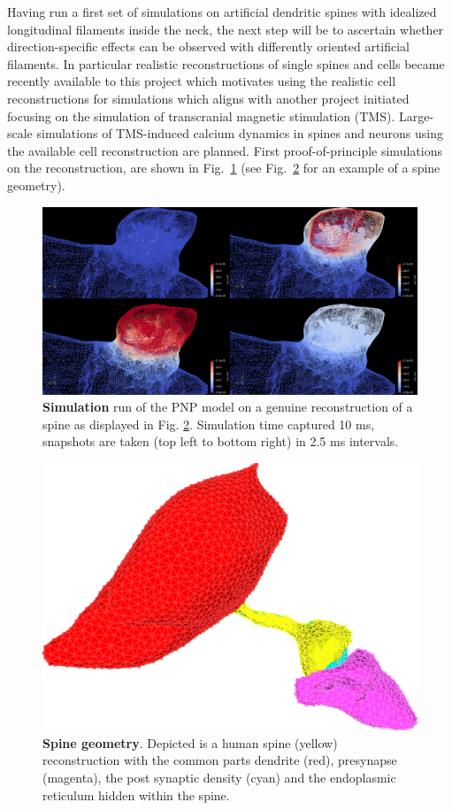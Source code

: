 Having run a first set of simulations on artificial dendritic spines with idealized longitudinal filaments inside the neck,
the next step will be to ascertain whether direction-specific effects can be
observed with differently oriented artificial filaments. In particular realistic
reconstructions of single spines and cells became recently
 available to this project which motivates using the realistic cell reconstructions
for simulations which aligns with another project initiated focusing on the
simulation of transcranial magnetic stimulation (TMS). Large-scale simulations
of TMS-induced calcium dynamics in spines and neurons using
the available cell reconstruction are planned. First proof-of-principle simulations
on the reconstruction, are shown in Fig.~\ref{fig:spine_simulation} (see Fig.~\ref{fig:spine} for an example of a spine geometry).

\begin{figure}[h!]
\centering
\includegraphics[scale=0.15]{inc/img/new_spine_simu.png}
\caption{\textbf{Simulation} run of the PNP model on a genuine reconstruction of a spine as displayed
in Fig. \ref{fig:spine}. Simulation time captured 10 ms, snapshots are taken (top left to bottom right) in 2.5 ms intervals.}
\label{fig:spine_simulation}
\end{figure}

\begin{figure}[h!]
\centering
\includegraphics[scale=0.15]{inc/img/spine.png}
\caption{\textbf{Spine geometry}. Depicted is a human spine (yellow) reconstruction with
the common parts dendrite (red), presynapse (magenta), the post synaptic density (cyan)
and the endoplasmic reticulum hidden within the spine.}
\label{fig:spine}
\end{figure}


